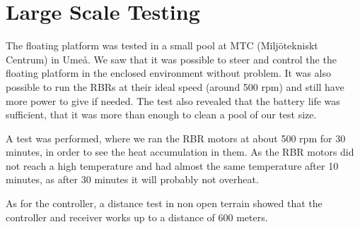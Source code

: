 \section{Large Scale Testing}
The floating platform was tested in a small pool at MTC (Miljötekniskt Centrum) in Umeå. We saw that it was possible to steer and control the the floating platform in the enclosed environment without problem. It was also possible to run the RBRs at their ideal speed (around 500 rpm) and still have more power to give if needed. The test also revealed that the battery life was sufficient, that it was more than enough to clean a pool of our test size.

A test was performed, where we ran the RBR motors at about 500 rpm for 30 minutes, in order to see the heat accumulation in them. As the RBR motors did not reach a high temperature and had almost the same temperature after 10 minutes, as after 30 minutes it will probably not overheat.

As for the controller, a distance test in non open terrain showed that the controller and receiver works up to a distance of 600 meters.

